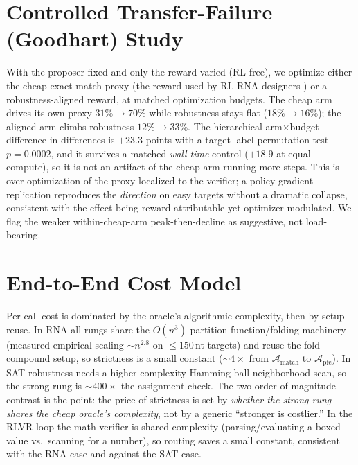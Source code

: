 \documentclass[letterpaper]{article} %
\newcommand{\match}{\ensuremath{\mathcal{A}_{\mathrm{match}}}}
\newcommand{\pfe}{\ensuremath{\mathcal{A}_{\mathrm{pfe}}}}
\begin{document}
\section{Controlled Transfer-Failure (Goodhart) Study}\label{supp:goodhart}
With the proposer fixed and only the reward varied (RL-free), we optimize either the cheap exact-match proxy
(the reward used by RL RNA designers \citep{runge2019learna}) or a robustness-aligned reward, at matched
optimization budgets. The cheap arm drives its own proxy $31\%\!\to\!70\%$ while robustness stays flat
($18\%\!\to\!16\%$); the aligned arm climbs robustness $12\%\!\to\!33\%$. The hierarchical
arm$\times$budget difference-in-differences is $+23.3$ points with a target-label permutation test
$p{=}0.0002$, and it survives a matched-\emph{wall-time} control ($+18.9$ at equal compute), so it is not an
artifact of the cheap arm running more steps. This is over-optimization of the proxy
\citep{gao2023overoptimization} localized to the verifier; a policy-gradient replication reproduces the
\emph{direction} on easy targets without a dramatic collapse, consistent with the effect being
reward-attributable yet optimizer-modulated. We flag the weaker within-cheap-arm peak-then-decline as
suggestive, not load-bearing.

\section{End-to-End Cost Model}\label{supp:cost}
Per-call cost is dominated by the oracle's algorithmic complexity, then by setup reuse. In RNA all rungs share
the $O(n^3)$ partition-function/folding machinery (measured empirical scaling $\sim n^{2.8}$ on
$\le150$\,nt targets) and reuse the fold-compound setup, so strictness is a small constant ($\sim\!4\times$
from $\match$ to $\pfe$). In SAT robustness needs a higher-complexity Hamming-ball neighborhood scan, so the
strong rung is $\sim\!400\times$ the assignment check. The two-order-of-magnitude contrast is the point: the
price of strictness is set by \emph{whether the strong rung shares the cheap oracle's complexity}, not by a
generic ``stronger is costlier.'' In the RLVR loop the math verifier is shared-complexity (parsing/evaluating a
boxed value vs.\ scanning for a number), so routing saves a small constant, consistent with the RNA case and
against the SAT case.
\end{document}

